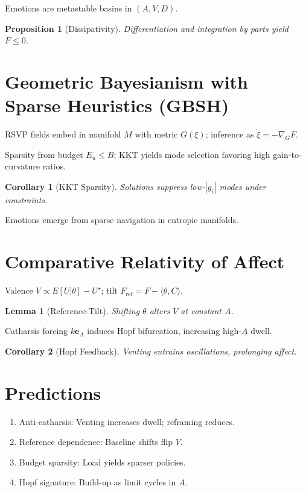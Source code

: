 \documentclass[11pt]{article}
\theoremstyle{plain}
\newtheorem{proposition}{Proposition}
\newtheorem{lemma}{Lemma}
\newtheorem{corollary}{Corollary}
\begin{document}
Emotions are metastable basins in \((A, V, D)\).

\begin{proposition}[Dissipativity]
Differentiation and integration by parts yield \(\dot{F} \leq 0\).
\end{proposition}

\section{Geometric Bayesianism with Sparse Heuristics (GBSH)}

RSVP fields embed in manifold \(M\) with metric \(G(\xi)\); inference as \(\dot{\xi} = -\nabla_G F\).

Sparsity from budget \(E_u \leq B\); KKT yields mode selection favoring high gain-to-curvature ratios.

\begin{corollary}[KKT Sparsity]
Solutions suppress low-\(|g_i|\) modes under constraints.
\end{corollary}

Emotions emerge from sparse navigation in entropic manifolds.

\section{Comparative Relativity of Affect}

Valence \(V \propto E[U|\theta] - U^\star\); tilt \(F_{\text{ref}} = F - \langle \theta, C \rangle\).

\begin{lemma}[Reference-Tilt]
Shifting \(\theta\) alters \(V\) at constant \(A\).
\end{lemma}

Catharsis forcing \(k \mathbf{e}_A\) induces Hopf bifurcation, increasing high-\(A\) dwell.

\begin{corollary}[Hopf Feedback]
Venting entrains oscillations, prolonging affect.
\end{corollary}

\section{Predictions}

\begin{enumerate}
\item Anti-catharsis: Venting increases dwell; reframing reduces.
\item Reference dependence: Baseline shifts flip \(V\).
\item Budget sparsity: Load yields sparser policies.
\item Hopf signature: Build-up as limit cycles in \(A\).
\end{enumerate}
\end{document}
